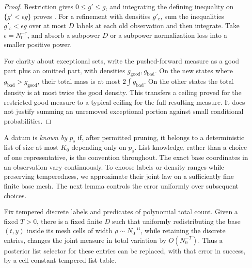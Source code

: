 \begin{proof}
Restriction gives \(0\le g'\le g\), and integrating the defining
inequality on \(\{g'<\epsilon g\}\) proves
.  For a refinement with densities
\(g'_c\), sum the inequalities \(g'_c<\epsilon g\) over at most \(D\)
labels at each old observation and then integrate.
Take \(\epsilon=N_0^{-\tau}\), and absorb a subpower \(D\) or a
subpower normalization loss into a smaller positive power.

For clarity about exceptional sets, write the pushed-forward
measure as a good part plus an omitted part, with densities
\(g_{\mathrm{good}},g_{\mathrm{bad}}\).
On the new states where \(g_{\mathrm{bad}}>g_{\mathrm{good}}\),
their total mass is at most \(2\int g_{\mathrm{bad}}\).
On the other states the total density is at most twice the good
density.  This transfers a ceiling proved for the restricted good
measure to a typical ceiling for the full resulting measure.
It does not justify summing an unremoved exceptional portion
against small conditional probabilities.
\end{proof}

A datum is \emph{known by \(p_s\)} if, after permitted pruning, it
belongs to a deterministic list of size at most \(K_0\) depending
only on \(p_s\).  List knowledge, rather than a choice of one
representative, is the convention throughout.
The exact base coordinates in an observation vary continuously.
To choose labels or density ranges while preserving temperedness, we
approximate their joint law on a sufficiently fine finite base mesh.
The next lemma controls the error uniformly over subsequent choices.

\begin{lemma}\label{a01:flattening}
Fix tempered discrete labels and predicates of polynomial total
count.  Given a fixed \(T>0\), there is a fixed finite \(D\) such that
uniformly redistributing the base \((t,y)\) inside its mesh cells
of width \(\rho\sim N_0^{-D}\), while retaining the discrete entries,
changes the joint measure in total variation by \(O(N_0^{-T})\).
Thus a posterior list selector for these entries can be replaced,
with that error in success, by a cell-constant tempered list table.
\end{lemma}

